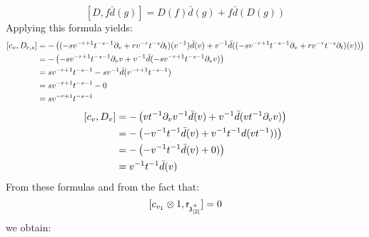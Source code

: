 \begin{remark}
\begin{enumerate}
\begin{enumerate}
\begin{enumerate}
                                $$[D, f \bar{d}(g)] = D(f) \bar{d}(g) + f \bar{d}( D(g) )$$
                            Applying this formula yields:
                                $$
                                    \begin{aligned}
                                        [c_v, D_{r, s}] & = -\left( (-s v^{-r + 1} t^{-s - 1} \del_v + r v^{-r} t^{-s} \del_t)(v^{-1}) \bar{d}(v) + v^{-1} \bar{d}( (-s v^{-r + 1} t^{-s - 1} \del_v + r v^{-r} t^{-s} \del_t)(v) ) \right)
                                        \\
                                        & = -\left( -s v^{-r + 1} t^{-s - 1} \del_v v + v^{-1} \bar{d}( -s v^{-r + 1} t^{-s - 1} \del_v v ) \right)
                                        \\
                                        & = s v^{-r + 1} t^{-s - 1} - s v^{-1} \bar{d}( v^{-r + 1} t^{-s - 1} )
                                        \\
                                        & = s v^{-r + 1} t^{-s - 1} - 0
                                        \\
                                        & = s v^{-r + 1} t^{-s - 1}
                                    \end{aligned}
                                $$
                                $$
                                    \begin{aligned}
                                        [c_v, D_v] & = -\left( v t^{-1} \del_v v^{-1} \bar{d}(v) + v^{-1} \bar{d}(v t^{-1} \del_v v)\right)
                                        \\
                                        & = -\left( - v^{-1} t^{-1} \bar{d}(v) + v^{-1} t^{-1} d(v t^{-1}) ) \right)
                                        \\
                                        & = -\left( - v^{-1} t^{-1} \bar{d}(v) + 0 ) \right)
                                        \\
                                        & = v^{-1} t^{-1} \bar{d}(v)
                                    \end{aligned}
                                $$
                            From these formulas and from the fact that:
                                $$[c_{v_1} \tensor 1, \sfr_{\z_{[2]}^+}] = 0$$
                            we obtain:
                                $$
                                    \begin{aligned}

\end{aligned}$$
\end{enumerate}
\end{enumerate}
\end{enumerate}
\end{remark}
